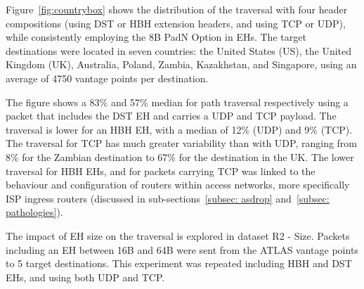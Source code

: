 \documentclass[conference]{IEEEtran}
\begin{document}

Figure~\ref{fig:countrybox} shows the distribution of the traversal with
four header compositions (using DST or HBH extension headers, and
using TCP or UDP), while consistently employing the 8B PadN Option in EHs.  The target
destinations were located in seven countries: the United States (US), the
United Kingdom (UK), Australia, Poland, Zambia, Kazakhstan, and Singapore, using
an average of 4750 vantage points per destination.

The figure shows a 83\% and 57\% median for path traversal 
respectively using a packet that includes the
DST EH and carries a UDP and TCP payload.  The traversal is lower
for an HBH EH, with a median of 12\% (UDP) and 9\% (TCP). The traversal
 for TCP has much greater variability than with
UDP, ranging from 8\% for the Zambian destination to 67\% for the destination in the
UK. The lower traversal for HBH EHs, and for packets carrying TCP
was  linked to the
behaviour and configuration of routers within access networks, more
specifically ISP ingress routers (discussed in sub-sections~\ref{subsec: asdrop} and~\ref{subsec: pathologies}).

The impact of EH size on the traversal is explored in dataset R2 - Size. Packets including an EH between 16B and 64B were sent from the ATLAS vantage points to 5 target destinations.  This experiment was repeated including
HBH and DST EHs, and using both UDP and TCP. 

\end{document}
